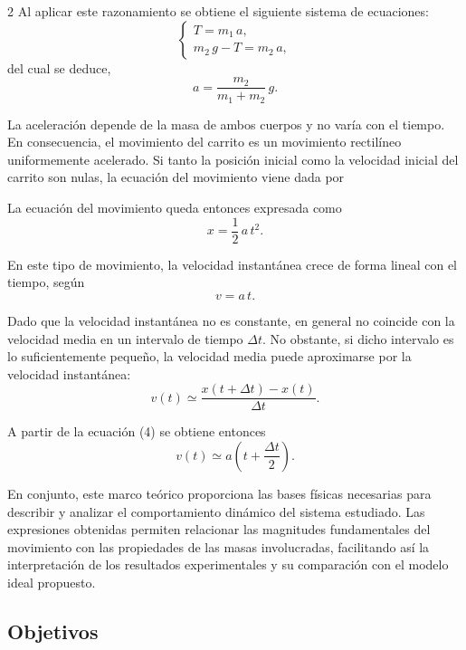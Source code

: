 \documentclass[12pt,a4paper]{article}
\begin{document}
\begin{multicols}{2}
\bigskip
Al aplicar este razonamiento se obtiene el siguiente sistema de ecuaciones:
\begin{equation}
\begin{cases}
T = m_1 \, a, \\
m_2 \, g - T = m_2 \, a,
\end{cases}
\end{equation}
del cual se deduce,
\begin{equation}
a = \dfrac{m_2}{m_1 + m_2}\, g.
\end{equation}

La aceleración depende de la masa de ambos cuerpos y no varía con el tiempo. En consecuencia, el movimiento del carrito es un movimiento rectilíneo uniformemente acelerado. Si tanto la posición inicial como la velocidad inicial del carrito son nulas, la ecuación del movimiento viene dada por

La ecuación del movimiento queda entonces expresada como
\begin{equation}
x = \frac{1}{2}\, a\, t^2.
\end{equation}

En este tipo de movimiento, la velocidad instantánea crece de forma lineal con el tiempo, según
\begin{equation}
v = a\, t.
\end{equation}

Dado que la velocidad instantánea no es constante, en general no coincide con la velocidad media en un intervalo de tiempo $\Delta t$. No obstante, si dicho intervalo es lo suficientemente pequeño, la velocidad media puede aproximarse por la velocidad instantánea:
\begin{equation}
v(t) \simeq \frac{x(t+\Delta t)-x(t)}{\Delta t}.
\end{equation}

A partir de la ecuación (4) se obtiene entonces
\begin{equation}
v(t) \simeq a\left(t + \frac{\Delta t}{2}\right).
\end{equation}

En conjunto, este marco teórico proporciona las bases físicas necesarias para describir y analizar el comportamiento dinámico del sistema estudiado. Las expresiones obtenidas permiten relacionar las magnitudes fundamentales del movimiento con las propiedades de las masas involucradas, facilitando así la interpretación de los resultados experimentales y su comparación con el modelo ideal propuesto.

\subsection{Objetivos}


\end{multicols}
\end{document}
